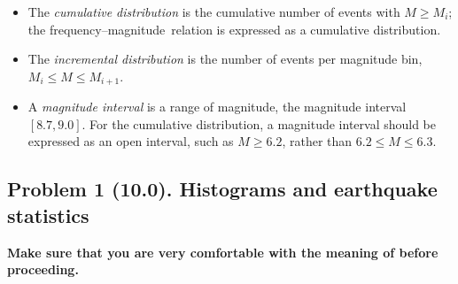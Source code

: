\documentclass[11pt,titlepage,fleqn]{article}
\newcommand{\fmag}{frequency--magnitude}
\begin{document}
\begin{itemize}
\item The {\em cumulative distribution} is the cumulative number of events with $M \ge M_i$; the \fmag\ relation is expressed as a cumulative distribution.
\item The {\em incremental distribution} is the number of events per magnitude bin, $M_i \le M \le M_{i+1}$.
\item A {\em magnitude interval} is a range of magnitude, \eg the magnitude interval $[8.7,9.0]$. For the cumulative distribution, a magnitude interval should be expressed as an open interval, such as $M \ge 6.2$, rather than $6.2 \le M \le 6.3$.
\end{itemize}



\pagebreak
\subsection*{Problem 1 (10.0). Histograms and earthquake statistics}

{\bf Make sure that you are very comfortable with the meaning of  before proceeding.}
\end{document}
